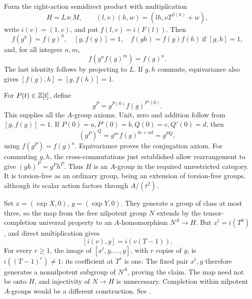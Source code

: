 Form the right-action semidirect product with multiplication
\[
 H=L\ltimes M,\qquad (l,v)(h,w)=(lh,vT^{\beta(h)}+w),
\]
write \(i(v)=(1,v)\), and put \(f(l,v)=i(F(l))\).
Then
\[
 f(g^h)=f(g)^h,\quad [g,f(g)]=1,\quad
 f(gh)=f(g)f(h)\ \text{if }[g,h]=1,
\]
and, for all integers \(n,m\),
\[
 f(g^nf(g)^m)=f(g)^n.
\]
The last identity follows by projecting to \(L\).
If \(g,h\) commute, equivariance also gives
\([f(g),h]=[g,f(h)]=1\).

For \(P(t)\in\mathbb Z[t]\), define
\[
 g^P=g^{P(0)}f(g)^{P'(0)}.
\]
This supplies all the \(A\)-group axioms. Unit, zero and addition
follow from \([g,f(g)]=1\).
If \(P(0)=a,P'(0)=b,Q(0)=c,Q'(0)=d\), then
\[
 (g^P)^Q=g^{ac}f(g)^{bc+ad}=g^{PQ},
\]
using \(f(g^P)=f(g)^a\).
Equivariance proves the conjugation axiom. For commuting \(g,h\),
the cross-commutations just established allow rearrangement to give
\((gh)^P=g^Ph^P\).
Thus \(H\) is an \(A\)-group in the required unrestricted category.
It is torsion-free as an ordinary group, being an extension of
torsion-free groups, although its scalar action factors through
\(A/(t^2)\).

Set \(x=(\exp X,0)\), \(y=(\exp Y,0)\).
They generate a group of class at most three, so the map from the
free nilpotent group \(N\) extends by the tensor-completion universal
property to an \(A\)-homomorphism \(N^A\to H\).
But \(x^t=i(T^0)\), and direct multiplication gives
\[
 [i(v),y]=i(v(T-1)).
\]
For every \(r\ge1\), the image of \([x^t,y,\ldots,y]\), with \(r\)
copies of \(y\), is \(i((T-1)^r)\ne1\): its coefficient at \(T^r\)
is one. The fixed pair \(x^t,y\) therefore generates a nonnilpotent
subgroup of \(N^A\), proving the claim.
The map need not be onto \(H\), and injectivity of \(N\to H\) is
unnecessary. Completion within nilpotent \(A\)-groups would be a
different construction. See .
